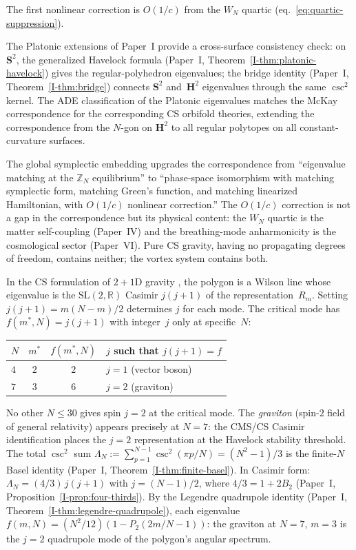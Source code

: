 \begin{proposition}
\begin{enumerate}
  The first nonlinear correction is $O(1/c)$
  from the $W_N$ quartic
  (eq.~\eqref{eq:quartic-suppression}).
\end{enumerate}
The Platonic extensions of Paper~I provide a
cross-surface consistency check:
on $\mathbf{S}^2$, the generalized Havelock formula
(Paper~I, Theorem~\ref*{I-thm:platonic-havelock})
gives the regular-polyhedron eigenvalues;
the bridge identity (Paper~I, Theorem~\ref*{I-thm:bridge})
connects $\mathbf{S}^2$ and~$\mathbf{H}^2$ eigenvalues
through the same $\csc^2$ kernel.
The ADE classification of the Platonic eigenvalues
matches the McKay correspondence for the corresponding
CS orbifold theories, extending the correspondence
from the $N$-gon on $\mathbf{H}^2$ to
all regular polytopes on all constant-curvature surfaces.
\end{proposition}

\noindent
The global symplectic embedding upgrades the correspondence
from ``eigenvalue matching at the $\mathbb{Z}_N$
equilibrium'' to ``phase-space isomorphism with matching
symplectic form, matching Green's function, and matching
linearized Hamiltonian, with $O(1/c)$ nonlinear correction.''
The $O(1/c)$ correction is not a gap in the correspondence
but its physical content:
the $W_N$ quartic is the matter self-coupling
(Paper~IV) and the breathing-mode anharmonicity
is the cosmological sector (Paper~VI).
Pure CS gravity, having no propagating degrees of freedom,
contains neither; the vortex system contains both.

\medskip

In the CS formulation of $2{+}1$D gravity
\citep{Witten1988}, the polygon is a Wilson line
whose eigenvalue is the $\mathrm{SL}(2,\mathbb{R})$ Casimir
$j(j{+}1)$ of the representation~$R_m$.
Setting $j(j{+}1) = m(N{-}m)/2$ determines $j$ for each mode.
The critical mode has $f(m^*,N) = j(j{+}1)$
with integer~$j$ only at specific~$N$:
\begin{center}
\small
\begin{tabular}{lccl}
\toprule
$N$ & $m^*$ & $f(m^*,N)$ & $j$ such that $j(j{+}1) = f$ \\
\midrule
$4$ & $2$ & $2$ & $j = 1$ (vector boson) \\
$7$ & $3$ & $6$ & $j = 2$ (graviton) \\
\bottomrule
\end{tabular}
\end{center}
\noindent
No other $N \le 30$ gives spin $j = 2$ at the critical mode.
The \emph{graviton} (spin-$2$ field of general relativity)
appears precisely at $N = 7$: the CMS/CS Casimir identification
places the $j = 2$ representation at the Havelock stability
threshold.
The total $\csc^2$ sum
$\Lambda_N := \sum_{p=1}^{N-1}\csc^2(\pi p/N) = (N^2{-}1)/3$
is the finite-$N$ Basel identity
(Paper~I, Theorem~\ref*{I-thm:finite-basel}).
In Casimir form:
$\Lambda_N = (4/3)\,j(j{+}1)$ with $j = (N{-}1)/2$,
where $4/3 = 1 + 2B_2$
(Paper~I, Proposition~\ref*{I-prop:four-thirds}).
By the Legendre quadrupole identity
(Paper~I, Theorem~\ref*{I-thm:legendre-quadrupole}),
each eigenvalue $f(m,N) = (N^2/12)(1 - P_2(2m/N{-}1))$:
the graviton at $N = 7$, $m = 3$ is the $j = 2$
quadrupole mode of the polygon's angular spectrum.

